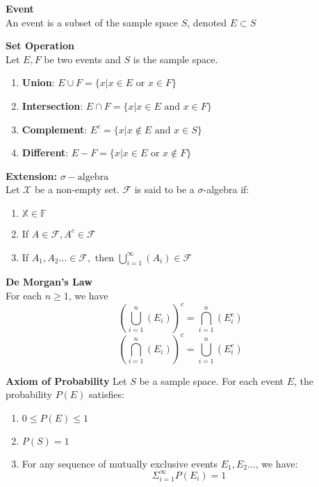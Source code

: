 \documentclass{article}
\begin{document}
\begin{definition}
    \textbf{Event}\\
    An event is a subset of the sample space $S$, denoted $E \subset S$
\end{definition}

\begin{definition}
    \textbf{Set Operation}\\
    Let $E,F$ be two events and $S$ is the sample space.
    \begin{enumerate}
        \item \textbf{Union}: $ E \cup F = \{ x | x\in E \text{ or } x \in F\}$
        \item \textbf{Intersection}: $ E \cap F = \{ x | x\in E \text{ and } x \in F\}$
        \item \textbf{Complement}: $ E^c = \{ x | x \notin E \text{ and } x \in S\}$
        \item \textbf{Different}: $ E - F = \{ x | x\in E \text{ or } x \notin F\}$
    \end{enumerate}
\end{definition}

\begin{definition}
    \textbf{Extension:} $\sigma-\text{algebra}$\\
    Let $\mathcal{X}$ be a non-empty set. $\mathcal{F}$ is said to be a $\sigma$-algebra if:
    \begin{enumerate}
        \item $\mathbb{X} \in \mathbb{F}$
        \item If $A \in \mathcal{F}, A^c \in \mathcal{F}$
        \item If $A_1,A_2 \dots \in \mathcal{F}, \text{ then } \bigcup^{\infty}_{i=1}(A_i) \in \mathcal{F}$
    \end{enumerate}
\end{definition}

\begin{theorem}
    \textbf{De Morgan's Law}\\
    For each $n \geq 1$, we have
    $$ (\bigcup^n_{i=1}(E_i))^c = \bigcap^n_{i=1}(E^c_i)$$
    $$ (\bigcap^n_{i=1}(E_i))^c = \bigcup^n_{i=1}(E^c_i)$$
\end{theorem}

\begin{axiom}
    \textbf{Axiom of Probability}
    Let $S$ be a sample space. For each event $E$, the probability $P(E)$ satisfies:
    \begin{enumerate}
        \item $0 \leq P(E) \leq 1$
        \item $P(S) = 1$
        \item For any sequence of mutually exclusive events $E_1,E_2 \dots$, we have:
        $$ \Sigma^\infty_{i=1}P(E_i) = 1$$
    \end{enumerate}
\end{axiom}
\end{document}
